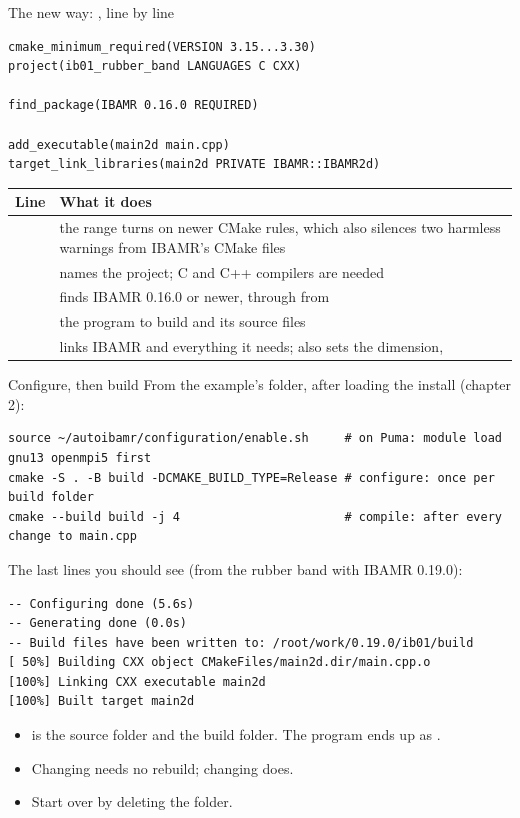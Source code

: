 \documentclass[aspectratio=169,11pt]{beamer}
\begin{document}
\begin{frame}[fragile]{The new way: , line by line}
\begin{lstlisting}[style=shell]
cmake_minimum_required(VERSION 3.15...3.30)
project(ib01_rubber_band LANGUAGES C CXX)

find_package(IBAMR 0.16.0 REQUIRED)

add_executable(main2d main.cpp)
target_link_libraries(main2d PRIVATE IBAMR::IBAMR2d)
\end{lstlisting}
\small
\begin{tabular}{@{}L{0.33\textwidth}L{0.63\textwidth}@{}}
\toprule
Line & What it does \\
\midrule
{} & the range turns on newer CMake rules, which also silences two harmless warnings from IBAMR's CMake files \\
 & names the project; C and C++ compilers are needed \\
 & finds IBAMR 0.16.0 or newer, through  from  \\
 & the program to build and its source files \\
 & links IBAMR and everything it needs;  also sets the dimension,  \\
\bottomrule
\end{tabular}
\end{frame}

\begin{frame}[fragile]{Configure, then build}
From the example's folder, after loading the install (chapter 2):
\begin{lstlisting}[style=shell]
source ~/autoibamr/configuration/enable.sh     # on Puma: module load gnu13 openmpi5 first
cmake -S . -B build -DCMAKE_BUILD_TYPE=Release # configure: once per build folder
cmake --build build -j 4                       # compile: after every change to main.cpp
\end{lstlisting}
The last lines you should see (from the rubber band with IBAMR 0.19.0):
\begin{lstlisting}[style=tiny]
-- Configuring done (5.6s)
-- Generating done (0.0s)
-- Build files have been written to: /root/work/0.19.0/ib01/build
[ 50%] Building CXX object CMakeFiles/main2d.dir/main.cpp.o
[100%] Linking CXX executable main2d
[100%] Built target main2d
\end{lstlisting}
\begin{itemize}\small
  \item {} is the source folder and  the build folder. The program ends up as .
  \item Changing  needs no rebuild; changing  does.
  \item Start over by deleting the  folder.
\end{itemize}
\end{frame}
\end{document}
